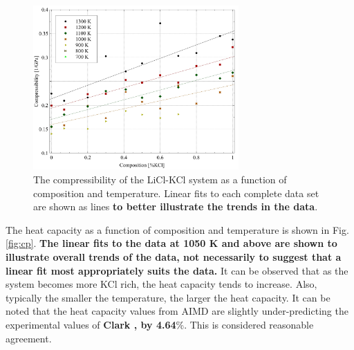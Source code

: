 \documentclass[review]{elsarticle}
\providecommand{\DIFaddtex}[1]{{\bf #1}} %
\providecommand{\DIFdeltex}[1]{} %
\providecommand{\DIFaddbegin}{\protect\color{blue}} %
\providecommand{\DIFaddend}{\protect\color{black}} %
\providecommand{\DIFdelbegin}{\protect\color{red}} %
\providecommand{\DIFdelend}{\protect\color{black}} %
\providecommand{\DIFaddFL}[1]{\DIFadd{#1}} %
\providecommand{\DIFaddbeginFL}{} %
\providecommand{\DIFaddendFL}{} %
\providecommand{\DIFdelbeginFL}{} %
\providecommand{\DIFdelendFL}{} %
\providecommand{\DIFadd}[1]{\texorpdfstring{\DIFaddtex{#1}}{#1}} %
\providecommand{\DIFdel}[1]{\texorpdfstring{\DIFdeltex{#1}}{}} %
\newcommand{\DIFscaledelfig}{0.5}
\newlength{\DIFdelgraphicswidth} %
\newlength{\DIFdelgraphicsheight} %
\newcommand{\DIFaddincludegraphics}[2][]{{\color{blue}\fbox{\DIFOincludegraphics[#1]{#2}}}} %
\newcommand{\DIFdelincludegraphics}[2][]{%
\sbox{\DIFdelgraphicsbox}{\DIFOincludegraphics[#1]{#2}}%
\settoboxwidth{\DIFdelgraphicswidth}{\DIFdelgraphicsbox} %
\settoboxtotalheight{\DIFdelgraphicsheight}{\DIFdelgraphicsbox} %
\scalebox{\DIFscaledelfig}{%
\parbox[b]{\DIFdelgraphicswidth}{\usebox{\DIFdelgraphicsbox}\\[-\baselineskip] \rule{\DIFdelgraphicswidth}{0em}}\llap{\resizebox{\DIFdelgraphicswidth}{\DIFdelgraphicsheight}{%
\setlength{\unitlength}{\DIFdelgraphicswidth}%
\begin{picture}(1,1)%
\thicklines\linethickness{2pt} %
{\color[rgb]{1,0,0}\put(0,0){\framebox(1,1){}}}%
{\color[rgb]{1,0,0}\put(0,0){\line( 1,1){1}}}%
{\color[rgb]{1,0,0}\put(0,1){\line(1,-1){1}}}%
\end{picture}%
}\hspace*{3pt}}} %
} %
\DeclareRobustCommand{\DIFaddbegin}{\DIFOaddbegin \let\includegraphics\DIFaddincludegraphics} %
\DeclareRobustCommand{\DIFaddend}{\DIFOaddend \let\includegraphics\DIFOincludegraphics} %
\DeclareRobustCommand{\DIFdelbegin}{\DIFOdelbegin \let\includegraphics\DIFdelincludegraphics} %
\DeclareRobustCommand{\DIFdelend}{\DIFOaddend \let\includegraphics\DIFOincludegraphics} %
\DeclareRobustCommand{\DIFaddbeginFL}{\DIFOaddbeginFL \let\includegraphics\DIFaddincludegraphics} %
\DeclareRobustCommand{\DIFaddendFL}{\DIFOaddendFL \let\includegraphics\DIFOincludegraphics} %
\DeclareRobustCommand{\DIFdelbeginFL}{\DIFOdelbeginFL \let\includegraphics\DIFdelincludegraphics} %
\DeclareRobustCommand{\DIFdelendFL}{\DIFOaddendFL \let\includegraphics\DIFOincludegraphics} %
\begin{document}
\begin{figure}[h]
 \centering
 \DIFdelbeginFL %
\DIFdelendFL \DIFaddbeginFL \includegraphics[width=0.7\textwidth]{images/compressibility.jpg} 
 \DIFaddendFL \caption{The compressibility of the LiCl-KCl system as a function of composition and temperature. Linear fits to each complete data set are shown as lines \DIFaddbeginFL \DIFaddFL{to better illustrate the trends in the data}\DIFaddendFL . }
 \label{fig:compressibility}
\end{figure} 

The heat capacity as a function of composition and temperature is shown in Fig. \ref{fig:cp}. \DIFaddbegin \DIFadd{The linear fits to the data at 1050 K and above are shown to illustrate overall trends of the data, not necessarily to suggest that a linear fit most appropriately suits the data. }\DIFaddend It can be observed that as the system becomes more KCl rich, the heat capacity tends to increase. Also, typically the smaller the temperature, the larger the heat capacity. It can be noted that the heat capacity values from AIMD are slightly under-predicting the experimental values of \DIFdelbegin \DIFdel{Janz \cite{Janz1974}, by 8.8}\DIFdelend \DIFaddbegin \DIFadd{Clark \cite{clark1973}, by 4.64}\DIFaddend \%. This is considered reasonable agreement.
\end{document}
